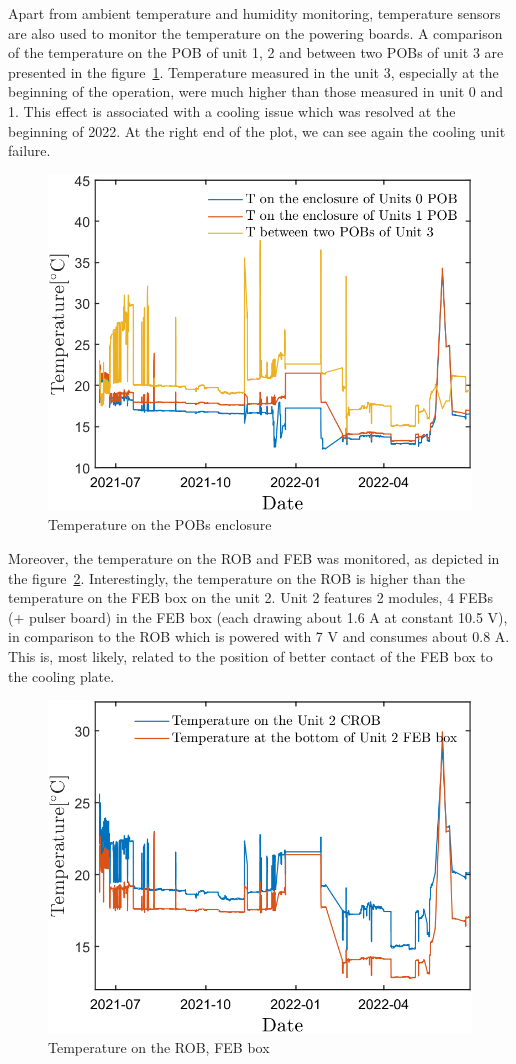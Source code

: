 Apart from ambient temperature and humidity monitoring, temperature sensors are also used to monitor the temperature on the powering boards. A comparison of the temperature on the \gls{POB} of unit 1, 2 and between two POBs of unit 3 are presented in the figure~\ref{fig_POB1}. Temperature measured in the unit 3, especially at the beginning of the operation, were much higher than those measured in unit 0 and 1. This effect is associated with a cooling issue which was resolved at the beginning of 2022. At the right end of the plot, we can see again the cooling unit failure. 
\begin{figure}[!h]
\centering
\includegraphics[width=0.55\columnwidth]{Chapter5/DCS/images/POB1.png}
\caption{Temperature on the POBs enclosure}
\label{fig_POB1}
\end{figure}
\newpage
Moreover, the temperature on the \gls{ROB} and \gls{FEB} was monitored, as depicted in the figure~\ref{fig_robvsfeb}. Interestingly, the temperature on the \gls{ROB} is higher than the temperature on the \gls{FEB} box on the unit 2. Unit 2 features 2 modules, 4 \gls{FEB}s (+ pulser board) in the \gls{FEB} box (each drawing about 1.6 A at constant 10.5 V), in comparison to the \gls{ROB} which is powered with 7 V and consumes about 0.8 A. This is, most likely, related to the position of better contact of the \gls{FEB} box to the cooling plate.

\begin{figure}[!h]
\centering
\includegraphics[width=0.55\columnwidth]{Chapter5/DCS/images/ROBvsFEB.png}
\caption{Temperature on the \gls{ROB}, \gls{FEB} box}
\label{fig_robvsfeb}
\end{figure}

